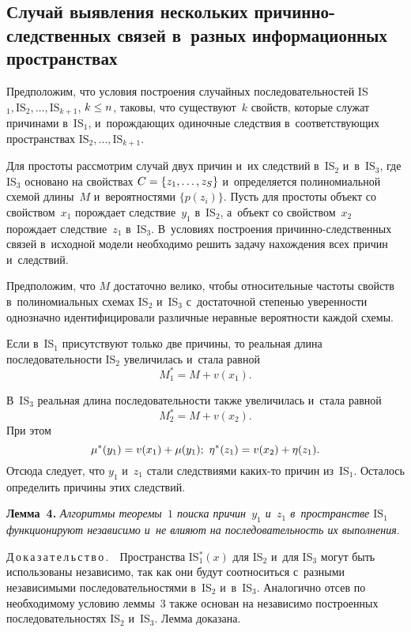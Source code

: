 \begin{multicols}{2}
  \section{Случай выявления нескольких причинно-следственных 
связей в~разных информационных пространствах }
  
  Предположим, что  условия построения случайных последовательностей IS$_1,  
\mathrm{IS}_2, \ldots, \mathrm{IS}_{k+1}$, $k\hm \leq n$,  таковы, что 
существуют~$k$ свойств, которые служат причинами в~IS$_1$, и~порождающих 
одиночные следствия в~соответствующих пространствах $\mathrm{IS}_2, \ldots , 
\mathrm{IS}_{k+1}$. 
  
  Для простоты рассмотрим случай двух причин и~их следствий в~IS$_2$ 
и~в~IS$_3$, где IS$_3$ основано на свойствах $C\hm= \{z_1, \ldots , z_S\}$ 
и~определяется полиномиальной схемой длины~$M$ и~вероятностями $\{ p(z_i)\}$. Пусть для простоты объект со свойством~$x_1$ порождает 
следствие~$y_1$ в~IS$_2$, а~объект со свойством~$x_2$ порождает 
следствие~$z_1$ в~IS$_3$. В~условиях построения  
при\-чин\-но-след\-ст\-вен\-ных связей в~исходной модели необходимо решить 
задачу на\-хож\-де\-ния всех причин и~следствий. 
  
  Предположим, что $M$ достаточно велико, чтобы относительные частоты 
свойств в~полиномиальных схемах IS$_2$ и~IS$_3$ с~достаточной степенью 
уверенности однозначно идентифицировали различные неравные вероятности 
каждой схемы. 
  
  Если в~IS$_1$ присутствуют только две причины, то реальная длина 
последовательности IS$_2$ увеличилась  и~стала равной 
  $$
  M_1^* =M+v(x_1).
  $$
   
В~IS$_3$ реальная длина последовательности также увеличилась и~стала равной 
$$
M_2^* =M+v(x_2).
$$
При этом 
$$
\mu^*(y_1) = v(x_1)+ \mu(y_1);\ \eta^*(z_1) \hm= v (x_2) 
+ \eta(z_1).
$$
 Отсюда следует, что $y_1$ и~$z_1$ стали следствиями ка\-ких-то 
причин из~IS$_1$. Осталось определить причины этих следствий.
  
  \smallskip
  
  \noindent
  \textbf{Лемма~4.} \textit{Алгоритмы теоремы~$1$ поиска причин~$y_1$ 
и~$z_1$ в~пространстве $\mathrm{IS}_1$ функционируют независимо и~не влияют на 
последовательность их выполнения}.
  
  \smallskip
  
  \noindent
  Д\,о\,к\,а\,з\,а\,т\,е\,л\,ь\,с\,т\,в\,о\,.\ \  Пространства IS$_1^* (x)$ для IS$_2$ 
и~для IS$_3$ могут быть использованы независимо, так как они будут 
соотноситься с~разными независимыми последовательностями в~IS$_2$ 
и~в~IS$_3$. Аналогично отсев по необходимому условию леммы~3 также 
основан на независимо построенных последовательностях IS$_2$ и~IS$_3$. 
Лемма доказана.
  

\end{multicols}
